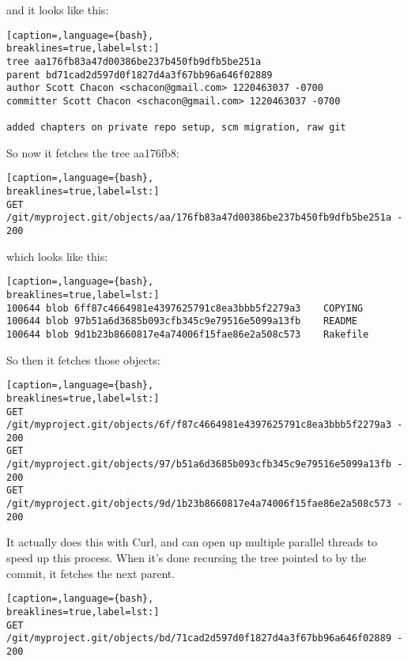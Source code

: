 and it looks like this:
\lstset{basicstyle=\scriptsize, numbers=none, captionpos=b, tabsize=4}
\begin{lstlisting}[caption=,language={bash},
breaklines=true,label=lst:]
tree aa176fb83a47d00386be237b450fb9dfb5be251a
parent bd71cad2d597d0f1827d4a3f67bb96a646f02889
author Scott Chacon <schacon@gmail.com> 1220463037 -0700
committer Scott Chacon <schacon@gmail.com> 1220463037 -0700

added chapters on private repo setup, scm migration, raw git
\end{lstlisting}

So now it fetches the tree aa176fb8:
\lstset{basicstyle=\scriptsize, numbers=none, captionpos=b, tabsize=4}
\begin{lstlisting}[caption=,language={bash},
breaklines=true,label=lst:]
GET /git/myproject.git/objects/aa/176fb83a47d00386be237b450fb9dfb5be251a - 200
\end{lstlisting}

which looks like this:
\lstset{basicstyle=\scriptsize, numbers=none, captionpos=b, tabsize=4}
\begin{lstlisting}[caption=,language={bash},
breaklines=true,label=lst:]
100644 blob 6ff87c4664981e4397625791c8ea3bbb5f2279a3    COPYING
100644 blob 97b51a6d3685b093cfb345c9e79516e5099a13fb    README
100644 blob 9d1b23b8660817e4a74006f15fae86e2a508c573    Rakefile
\end{lstlisting}

So then it fetches those objects:
\lstset{basicstyle=\scriptsize, numbers=none, captionpos=b, tabsize=4}
\begin{lstlisting}[caption=,language={bash},
breaklines=true,label=lst:]
GET /git/myproject.git/objects/6f/f87c4664981e4397625791c8ea3bbb5f2279a3 - 200
GET /git/myproject.git/objects/97/b51a6d3685b093cfb345c9e79516e5099a13fb - 200
GET /git/myproject.git/objects/9d/1b23b8660817e4a74006f15fae86e2a508c573 - 200
\end{lstlisting}

It actually does this with Curl, and can open up multiple parallel threads to
speed up this process. When it's done recursing the tree pointed to by the
commit, it fetches the next parent.
\lstset{basicstyle=\scriptsize, numbers=none, captionpos=b, tabsize=4}
\begin{lstlisting}[caption=,language={bash},
breaklines=true,label=lst:]
GET /git/myproject.git/objects/bd/71cad2d597d0f1827d4a3f67bb96a646f02889 - 200
\end{lstlisting}

